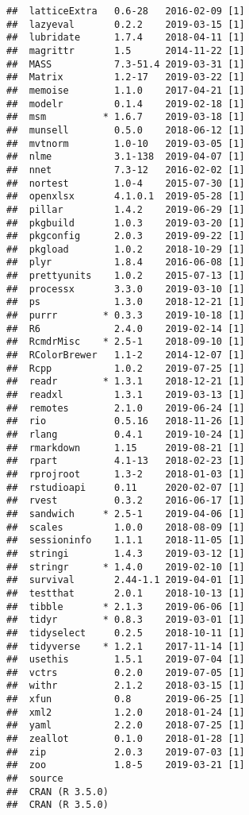 \documentclass[]{article}
\begin{document}
\begin{verbatim}
##  latticeExtra   0.6-28   2016-02-09 [1]
##  lazyeval       0.2.2    2019-03-15 [1]
##  lubridate      1.7.4    2018-04-11 [1]
##  magrittr       1.5      2014-11-22 [1]
##  MASS           7.3-51.4 2019-03-31 [1]
##  Matrix         1.2-17   2019-03-22 [1]
##  memoise        1.1.0    2017-04-21 [1]
##  modelr         0.1.4    2019-02-18 [1]
##  msm          * 1.6.7    2019-03-18 [1]
##  munsell        0.5.0    2018-06-12 [1]
##  mvtnorm        1.0-10   2019-03-05 [1]
##  nlme           3.1-138  2019-04-07 [1]
##  nnet           7.3-12   2016-02-02 [1]
##  nortest        1.0-4    2015-07-30 [1]
##  openxlsx       4.1.0.1  2019-05-28 [1]
##  pillar         1.4.2    2019-06-29 [1]
##  pkgbuild       1.0.3    2019-03-20 [1]
##  pkgconfig      2.0.3    2019-09-22 [1]
##  pkgload        1.0.2    2018-10-29 [1]
##  plyr           1.8.4    2016-06-08 [1]
##  prettyunits    1.0.2    2015-07-13 [1]
##  processx       3.3.0    2019-03-10 [1]
##  ps             1.3.0    2018-12-21 [1]
##  purrr        * 0.3.3    2019-10-18 [1]
##  R6             2.4.0    2019-02-14 [1]
##  RcmdrMisc    * 2.5-1    2018-09-10 [1]
##  RColorBrewer   1.1-2    2014-12-07 [1]
##  Rcpp           1.0.2    2019-07-25 [1]
##  readr        * 1.3.1    2018-12-21 [1]
##  readxl         1.3.1    2019-03-13 [1]
##  remotes        2.1.0    2019-06-24 [1]
##  rio            0.5.16   2018-11-26 [1]
##  rlang          0.4.1    2019-10-24 [1]
##  rmarkdown      1.15     2019-08-21 [1]
##  rpart          4.1-13   2018-02-23 [1]
##  rprojroot      1.3-2    2018-01-03 [1]
##  rstudioapi     0.11     2020-02-07 [1]
##  rvest          0.3.2    2016-06-17 [1]
##  sandwich     * 2.5-1    2019-04-06 [1]
##  scales         1.0.0    2018-08-09 [1]
##  sessioninfo    1.1.1    2018-11-05 [1]
##  stringi        1.4.3    2019-03-12 [1]
##  stringr      * 1.4.0    2019-02-10 [1]
##  survival       2.44-1.1 2019-04-01 [1]
##  testthat       2.0.1    2018-10-13 [1]
##  tibble       * 2.1.3    2019-06-06 [1]
##  tidyr        * 0.8.3    2019-03-01 [1]
##  tidyselect     0.2.5    2018-10-11 [1]
##  tidyverse    * 1.2.1    2017-11-14 [1]
##  usethis        1.5.1    2019-07-04 [1]
##  vctrs          0.2.0    2019-07-05 [1]
##  withr          2.1.2    2018-03-15 [1]
##  xfun           0.8      2019-06-25 [1]
##  xml2           1.2.0    2018-01-24 [1]
##  yaml           2.2.0    2018-07-25 [1]
##  zeallot        0.1.0    2018-01-28 [1]
##  zip            2.0.3    2019-07-03 [1]
##  zoo            1.8-5    2019-03-21 [1]
##  source                               
##  CRAN (R 3.5.0)                       
##  CRAN (R 3.5.0)                       

\end{verbatim}
\end{document}
